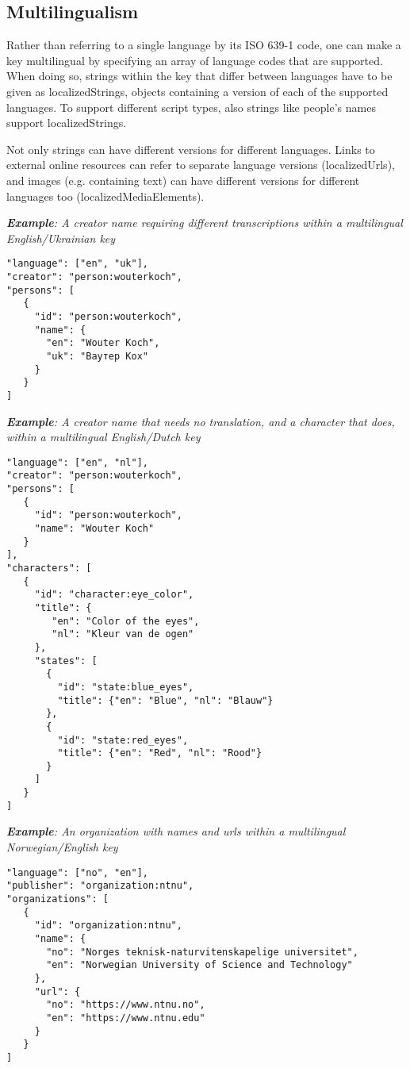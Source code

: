 \documentclass[10pt,letterpaper]{article}
\begin{document}
\subsection*{
Multilingualism
}
Rather than referring to a single language by its ISO 639-1 code, one can make a key multilingual by specifying an array of language codes that are supported. When doing so, strings within the key that differ between languages have to be given as localizedStrings, objects containing a version of each of the supported languages. To support different script types, also strings like people's names support localizedStrings.

Not only strings can have different versions for different languages. Links to external online resources can refer to separate language versions (localizedUrls), and images (e.g. containing text) can have different versions for different languages too (localizedMediaElements).

\textit{\textbf{Example}: A creator name requiring different transcriptions within a multilingual English/Ukrainian key}
\begin{verbatim}
"language": ["en", "uk"],
"creator": "person:wouterkoch",
"persons": [
   {
     "id": "person:wouterkoch",
     "name": {
       "en": "Wouter Koch",
       "uk": "Ваутер Кох"
     }
   }
]

\end{verbatim}

\textit{\textbf{Example}: A creator name that needs no translation, and a character that does, within a multilingual English/Dutch key}
\begin{verbatim}
"language": ["en", "nl"],
"creator": "person:wouterkoch",
"persons": [
   {
     "id": "person:wouterkoch",
     "name": "Wouter Koch"
   }
],
"characters": [
   {
     "id": "character:eye_color",
     "title": {
        "en": "Color of the eyes",
        "nl": "Kleur van de ogen"
     },
     "states": [
       {
         "id": "state:blue_eyes",
         "title": {"en": "Blue", "nl": "Blauw"}
       },
       {
         "id": "state:red_eyes",
         "title": {"en": "Red", "nl": "Rood"}
       }
     ]
   }
]

\end{verbatim}

\textit{\textbf{Example}: An organization with names and urls within a multilingual Norwegian/English key}
\begin{verbatim}
"language": ["no", "en"],
"publisher": "organization:ntnu",
"organizations": [
   {
     "id": "organization:ntnu",
     "name": {
       "no": "Norges teknisk-naturvitenskapelige universitet",
       "en": "Norwegian University of Science and Technology"
     },
     "url": {
       "no": "https://www.ntnu.no",
       "en": "https://www.ntnu.edu"
     }
   }
]

\end{verbatim}
\end{document}
